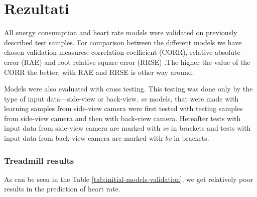 \chapter{Rezultati}\label{sec:rezultati}
All energy consumption and heart rate models were validated on previously described test samples. For comparison between the different models we have chosen validation measures: correlation coefficient (CORR), relative absolute error (RAE) and root relative square error (RRSE) \cite{witten2005data}.The higher the value of the CORR the better, with RAE and RRSE is other way around.

Models were also evaluated with cross testing. This testing was done only by the type of input data---side-view or back-view. \textit{sv} models, that were made with learning samples from side-view camera were first tested with testing samples from side-view camera and then with back-view camera. Hereafter tests with input data from side-view camera are marked with \textit{sv} in brackets and tests with input data from back-view camera are marked with \textit{bv} in brackets.

\subsection{Treadmill results}\label{sec:initial-models}
As can be seen in the Table \ref{tab:initial-models-validation}, we get relatively poor results in the prediction of heart rate.

